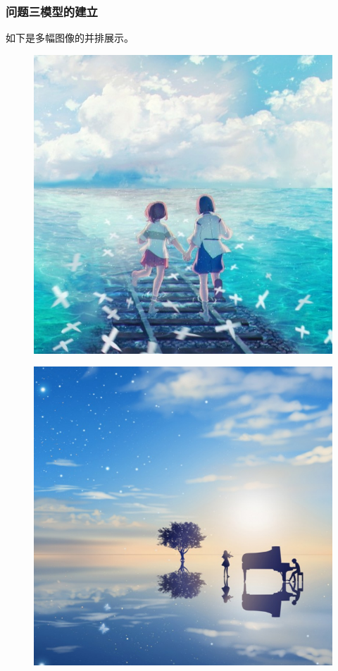 \documentclass{my_cumcmthesis}
\begin{document}
\subsubsection{问题三模型的建立}
   如下是多幅图像的并排展示。
    \begin{figure}[htbp] %
        \centering
        \begin{minipage}[c]{0.48\textwidth}
            \centering
            \includegraphics[scale=0.45]{source/朋友.jpg} %
            \label{fig:friends}
        \end{minipage}
        \begin{minipage}[c]{0.48\textwidth}
            \centering
            \includegraphics[scale=0.45]{source/合奏.png}

\end{minipage}
\end{figure}
\end{document}
